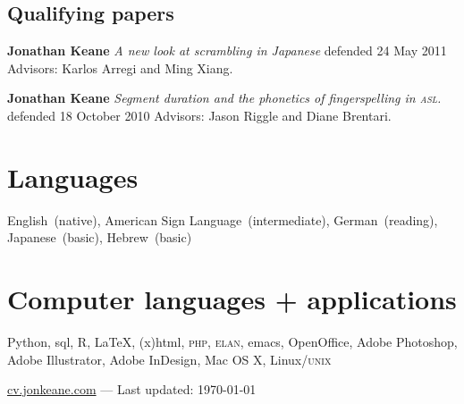 \documentclass[10pt, letterpaper]{article}
\newcommand{\years}[1]{\marginpar{\scriptsize #1}}
\begin{document}
\vspace{2ex}
\subsection*{Qualifying papers}
\begin{hangparas}{1em}{1}
\-\years{2011} \textbf{Jonathan Keane} \textit{A new look at scrambling in Japanese} defended 24 May 2011 Advisors: Karlos Arregi and Ming Xiang. 

\-\years{2010} \textbf{Jonathan Keane} \textit{Segment duration and the phonetics of fingerspelling in \textsc{asl}.} defended 18 October 2010 Advisors: Jason Riggle and Diane Brentari. 
\end{hangparas}
%
%

\section*{Languages}
\label{sec:languages}
English~(native), American Sign Language~(intermediate), German~(reading), Japanese~(basic), Hebrew~(basic)

\section*{Computer languages + applications}
\label{sec:computer}
Python, {\sc sql}, R, \LaTeX, {\sc (x)html}, \textsc{php}, \textsc{elan}, emacs, OpenOffice, Adobe Photoshop, Adobe Illustrator, Adobe InDesign, Mac OS X, Linux/\textsc{unix}

\vfill{}
\hrulefill
\begin{center}
{\footnotesize \href{http://cv.jonkeane.com}{cv.jonkeane.com} — Last updated: \isodate\today}
\end{center}
\end{document}
